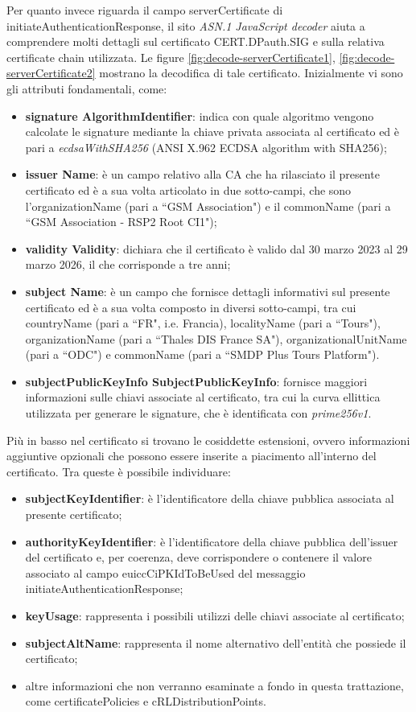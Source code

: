 \documentclass[10pt, oneside]{book}
\begin{document}
Per quanto invece riguarda il campo serverCertificate di initiateAuthenticationResponse, il sito \textit{ASN.1 JavaScript decoder} aiuta a comprendere molti dettagli sul certificato CERT.DPauth.SIG e sulla relativa certificate chain utilizzata. Le figure \ref{fig:decode-serverCertificate1}, \ref{fig:decode-serverCertificate2} mostrano la decodifica di tale certificato. Inizialmente vi sono gli attributi fondamentali, come:
\begin{itemize}
\item \textbf{signature AlgorithmIdentifier}: indica con quale algoritmo vengono calcolate le signature mediante la chiave privata associata al certificato ed è pari a \textit{ecdsaWithSHA256} (ANSI X.962 ECDSA algorithm with SHA256);
\item \textbf{issuer Name}: è un campo relativo alla CA che ha rilasciato il presente certificato ed è a sua volta articolato in due sotto-campi, che sono l'organizationName (pari a ``GSM Association") e il commonName (pari a ``GSM Association - RSP2 Root CI1");
\item \textbf{validity Validity}: dichiara che il certificato è valido dal 30 marzo 2023 al 29 marzo 2026, il che corrisponde a tre anni;
\item \textbf{subject Name}: è un campo che fornisce dettagli informativi sul presente certificato ed è a sua volta composto in diversi sotto-campi, tra cui countryName (pari a ``FR", i.e. Francia), localityName (pari a ``Tours"), organizationName (pari a ``Thales DIS France SA"), organizationalUnitName (pari a ``ODC") e commonName (pari a ``SMDP Plus Tours Platform").
\item \textbf{subjectPublicKeyInfo SubjectPublicKeyInfo}: fornisce maggiori informazioni sulle chiavi associate al certificato, tra cui la curva ellittica utilizzata per generare le signature, che è identificata con \textit{prime256v1}.
\end{itemize}
Più in basso nel certificato si trovano le cosiddette estensioni, ovvero informazioni aggiuntive opzionali che possono essere inserite a piacimento all'interno del certificato. Tra queste è possibile individuare:
\begin{itemize}
\item \textbf{subjectKeyIdentifier}: è l'identificatore della chiave pubblica associata al presente certificato;
\item \textbf{authorityKeyIdentifier}: è l'identificatore della chiave pubblica dell'issuer del certificato e, per coerenza, deve corrispondere o contenere il valore associato al campo euiccCiPKIdToBeUsed del messaggio initiateAuthenticationResponse;
\item \textbf{keyUsage}: rappresenta i possibili utilizzi delle chiavi associate al certificato;
\item \textbf{subjectAltName}: rappresenta il nome alternativo dell'entità che possiede il certificato;
\item altre informazioni che non verranno esaminate a fondo in questa trattazione, come certificatePolicies e cRLDistributionPoints.
\end{itemize}
\end{document}
